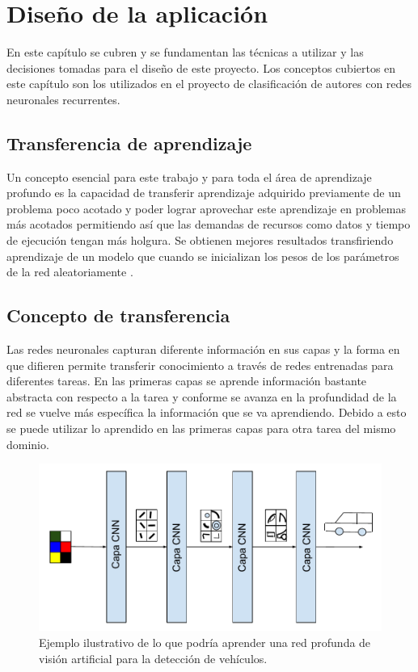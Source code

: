 
\chapter{Diseño de la aplicación} %

\label{Chapter3} %

En este capítulo se cubren y se fundamentan las técnicas a utilizar y las decisiones tomadas para el diseño de este proyecto. Los conceptos cubiertos en este capítulo son los utilizados en el proyecto de clasificación de autores con redes neuronales recurrentes.

\section{Transferencia de aprendizaje} %

Un concepto esencial para este trabajo y para toda el área de aprendizaje profundo es la capacidad de transferir aprendizaje adquirido previamente de un problema poco acotado y poder lograr aprovechar este aprendizaje en problemas más acotados permitiendo así que las demandas de recursos como datos y tiempo de ejecución tengan más holgura. Se obtienen mejores resultados transfiriendo aprendizaje de un modelo que cuando se inicializan los pesos de los parámetros de la red aleatoriamente \parencite{Erhan:2010:WUP}.

\section{Concepto de transferencia}

Las redes neuronales capturan diferente información en sus capas \parencite{yosinski:2014, zeiler2014visualizing} y la forma en que difieren permite transferir conocimiento a través de redes entrenadas para diferentes tareas. En las primeras capas se aprende información bastante abstracta con respecto a la tarea y conforme se avanza en la profundidad de la red se vuelve más específica la información que se va aprendiendo. Debido a esto se puede utilizar lo aprendido en las primeras capas para otra tarea del mismo dominio.

\begin{figure}
\includegraphics[scale=1]{Figures/learnbylayer.pdf}
\caption{Ejemplo ilustrativo de lo que podría aprender una red profunda de visión artificial para la detección de vehículos.}
\label{fig:learnbylayer}
\end{figure}

